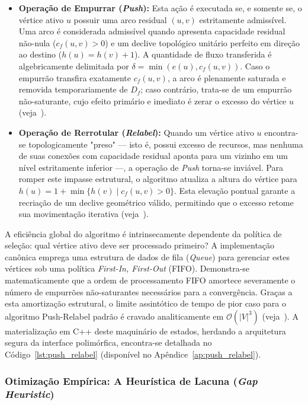 \documentclass[12pt,a4paper]{article}
\begin{document}
\begin{itemize}
    \item \textbf{Operação de Empurrar (\textit{Push}):} Esta ação é executada se, e somente se, o vértice ativo $u$ possuir uma arco residual $(u,v)$ estritamente admissível. Uma arco é considerada admissível quando apresenta capacidade residual não-nula ($c_f(u,v) > 0$) e um declive topológico unitário perfeito em direção ao destino ($h(u) = h(v) + 1$). A quantidade de fluxo transferida é algebricamente delimitada por $\delta = \min(e(u), c_f(u,v))$. Caso o empurrão transfira exatamente $c_f(u,v)$, a arco é plenamente saturada e removida temporariamente de $D_f$; caso contrário, trata-se de um empurrão não-saturante, cujo efeito primário e imediato é zerar o excesso do vértice $u$ (veja~\cite{cook1998combinatorial}).

    \item \textbf{Operação de Rerrotular (\textit{Relabel}):} Quando um vértice ativo $u$ encontra-se topologicamente "preso" — isto é, possui excesso de recursos, mas nenhuma de suas conexões com capacidade residual aponta para um vizinho em um nível estritamente inferior —, a operação de \textit{Push} torna-se inviável. Para romper este impasse estrutural, o algoritmo atualiza a altura do vértice para $h(u) = 1 + \min \{h(v) \mid c_f(u,v) > 0\}$. Esta elevação pontual garante a recriação de um declive geométrico válido, permitindo que o excesso retome sua movimentação iterativa (veja~\cite{korte2018combinatorial}).
\end{itemize}

A eficiência global do algoritmo é intrinsecamente dependente da política de seleção: qual vértice ativo deve ser processado primeiro? A implementação canônica emprega uma estrutura de dados de fila (\textit{Queue}) para gerenciar estes vértices sob uma política \textit{First-In, First-Out} (FIFO). Demonstra-se matematicamente que a ordem de processamento FIFO amortece severamente o número de empurrões não-saturantes necessários para a convergência. Graças a esta amortização estrutural, o limite assintótico de tempo de pior caso para o algoritmo Push-Relabel padrão é cravado analiticamente em $\mathcal{O}(|V|^3)$ (veja~\cite{goldberg1988new}). A materialização em C++ deste maquinário de estados, herdando a arquitetura segura da interface polimórfica, encontra-se detalhada no Código~\ref{lst:push_relabel} (disponível no Apêndice~\ref{ap:push_relabel}).

\subsubsection{Otimização Empírica: A Heurística de Lacuna (\textit{Gap Heuristic})}
\end{document}
